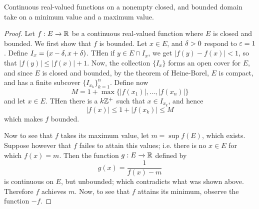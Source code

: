 \begin{theorem}\label{1.4.3}
    Continuous real-valued functions on a nonempty closed, and bounded domain
    take on a minimum value and a maximum value.
\end{theorem}
\begin{proof}
    Let $f:E \xrightarrow{} \mathbb{R}$ be a continuous real-valued function where $E$
    is closed and bounded. We first show that $f$ is bounded. Let  $x \in E$, and
    $\delta>0$ respond to  $\varepsilon=1$. Define  $I_x=(x-\delta,x+\delta)$. THen if $y \in E \cap
    I_x$, we get $|f(y)-f(x)|<1$, so that $|f(y)| \leq |f(x)|+1$. Now, the
    collection $\{I_x\}$ forms an open cover for $E$, and since  $E$ is closed
    and bounded, by the theorem of Heine-Borel, $E$ is compact, and has a finite
    subcover  $\{I_{x_k}\}_{k=1}^n$. Define now
    \begin{equation*}
        M=1+\max{\{|f(x_1)|, \dots, |f(x_n)|\}}
    \end{equation*}
    and let $x \in E$. THen there is a $k \mathbb{Z}^+$ such that $x \in I_{x_k}$, and
    hence
    \begin{equation*}
        |f(x)| \leq 1+|f(x_k)| \leq M
    \end{equation*}
    which makes $f$ bounded.

    Now to see that  $f$ takes its maximum value, let  $m=\sup{f(E)}$, which
    exists. Suppose however that $f$ failes to attain this values; i.e. there is
    no $x \in E$ for which  $f(x)=m$. Then the function $g:E \xrightarrow{} \mathbb{R}$
    defined by
    \begin{equation*}
        g(x)=\frac{1}{f(x)-m}
    \end{equation*}
    is continuous on $E$, but unbounded; which contradicts what was shown above.
    Therefore $f$ achieves $m$. Now, to see that  $f$ attains its minimum,
    observe the function  $-f$.
\end{proof}

